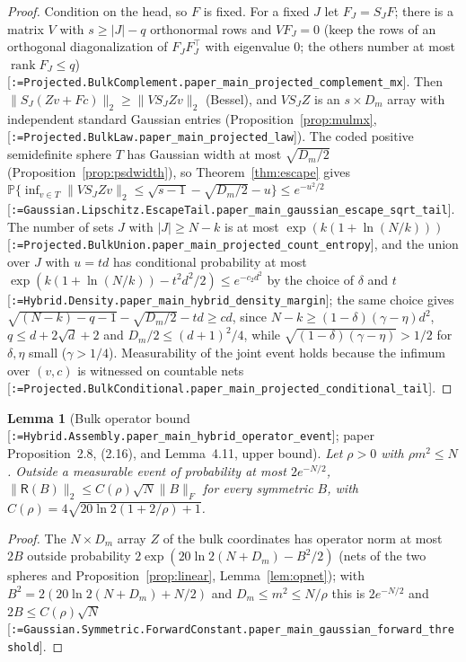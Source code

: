 \documentclass[11pt]{article}
\makeatletter
\newcommand{\formal@break}[1]{\@tfor\formal@tok:=#1\do{%
  \formal@tok
  \expandafter\ifx\formal@tok.\allowbreak\else
  \expandafter\ifx\formal@tok\_\allowbreak\fi\fi}}
\DeclareRobustCommand{\formal}[1]{\textnormal{[\texttt{\small\formal@break{#1}}]}}
\newcommand{\Prob}{\mathbb{P}}
\newcommand{\norm}[1]{\lVert #1\rVert}
\newcommand{\abs}[1]{\lvert #1\rvert}
\newcommand{\Fro}{F}
\newcommand{\sqd}{\sqrt{d}}
\newcommand{\Dd}{D}
\newcommand{\rank}{\operatorname{rank}}
\theoremstyle{plain}
\newtheorem{lemma}[theorem]{Lemma}
\theoremstyle{definition}
\makeatother
\begin{document}
\begin{proof}
Condition on the head, so $F$ is fixed. For a fixed $J$ let $F_J = S_JF$;
there is a matrix $V$ with $s \ge \abs{J} - q$ orthonormal rows and $VF_J = 0$
(keep the rows of an orthogonal diagonalization of $F_JF_J^{\top}$ with
eigenvalue $0$; the others number at most $\rank F_J \le q$)
\formal{Projected.BulkComplement.paper\_main\_projected\_complement\_mx}.
Then $\norm{S_J(Zv + Fc)}_2 \ge \norm{VS_JZv}_2$ (Bessel), and $VS_JZ$ is an
$s\times\Dd_m$ array with independent standard Gaussian entries
(Proposition~\ref{prop:mulmx}, \formal{Projected.BulkLaw.paper\_main\_projected\_law}).
The coded positive semidefinite sphere $T$ has Gaussian width at most
$\sqrt{\Dd_m/2}$ (Proposition~\ref{prop:psdwidth}), so Theorem~\ref{thm:escape}
gives $\Prob\{\inf_{v\in T}\norm{VS_JZv}_2 \le \sqrt{s - 1} - \sqrt{\Dd_m/2} - u\} \le e^{-u^2/2}$
\formal{Gaussian.Lipschitz.EscapeTail.paper\_main\_gaussian\_escape\_sqrt\_tail}.
The number of sets $J$ with $\abs{J} \ge N - k$ is at most
$\exp(k(1 + \ln(N/k)))$ \formal{Projected.BulkUnion.paper\_main\_projected\_count\_entropy},
and the union over $J$ with $u = td$ has conditional probability at most
$\exp(k(1 + \ln(N/k)) - t^2d^2/2) \le e^{-c_2d^2}$ by the choice of $\delta$ and
$t$ \formal{Hybrid.Density.paper\_main\_hybrid\_density\_margin}; the same
choice gives $\sqrt{(N - k) - q - 1} - \sqrt{\Dd_m/2} - td \ge cd$, since
$N - k \ge (1 - \delta)(\gamma - \eta)d^2$, $q \le d + 2\sqd + 2$ and
$\Dd_m/2 \le (d+1)^2/4$, while $\sqrt{(1-\delta)(\gamma - \eta)} > 1/2$ for
$\delta, \eta$ small ($\gamma > 1/4$). Measurability of the joint event
holds because the infimum over $(v, c)$ is witnessed on countable nets
\formal{Projected.BulkConditional.paper\_main\_projected\_conditional\_tail}.
\end{proof}

\begin{lemma}[Bulk operator bound \formal{Hybrid.Assembly.paper\_main\_hybrid\_operator\_event}; paper Proposition~2.8, (2.16), and Lemma~4.11, upper bound]\label{lem:bulkop}
Let $\rho > 0$ with $\rho m^2 \le N$. Outside a measurable event of
probability at most $2e^{-N/2}$, $\norm{\mathsf{R}(B)}_2 \le C(\rho)\sqrt N\norm{B}_\Fro$
for every symmetric $B$, with $C(\rho) = 4\sqrt{20\ln2(1 + 2/\rho) + 1}$.
\end{lemma}

\begin{proof}
The $N\times\Dd_m$ array $Z$ of the bulk coordinates has operator norm at most
$2B$ outside probability $2\exp(20\ln2(N + \Dd_m) - B^2/2)$ (nets of the two
spheres and Proposition~\ref{prop:linear}, Lemma~\ref{lem:opnet}); with
$B^2 = 2(20\ln2(N + \Dd_m) + N/2)$ and $\Dd_m \le m^2 \le N/\rho$ this is
$2e^{-N/2}$ and $2B \le C(\rho)\sqrt N$ \formal{Gaussian.Symmetric.ForwardConstant.paper\_main\_gaussian\_forward\_threshold}.
\end{proof}
\end{document}
